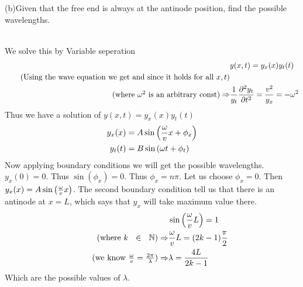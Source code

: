 \documentclass[addpoints]{exam}
\begin{document}
\begin{questions}
(b)Given that the free end is always at the antinode position, find the possible wavelengths.
\begin{solution}\\
    We solve this by Variable seperation 
    \begin{align*}
        &y(x,t) = y_x(x)y_t(t) \\ 
        \tag{Using the wave equation we get and since it holds for all $x,t$}\\ 
        \tag{where $\omega^2$ is an arbitrary const}
    \Rightarrow& \frac{1}{y_t}\pdv[2]{y_t}{t} = \frac{v^2}{y_x} = -\omega^2
    \end{align*}
    Thus we have a solution of $y(x,t)=y_x(x)y_t(t)$
    \begin{align*}
        y_x(x) &= A\sin\qty(\frac{\omega}{v}x+\phi_x)\\ 
        y_t(t) &=B \sin\qty(\omega t+\phi_t)
    \end{align*}
    Now applying boundary conditions we will get the possible wavelengths. $y_x(0)=0$. Thus 
    $\sin(\phi_x) = 0 $. Thus $\phi_x = n\pi$. Let us choose $\phi_x = 0$. Then 
    $y_x(x) = A\sin\qty(\frac{\omega}{v}x)$. The second boundary condition tell us that there is 
    an antinode at $x=L$, which says that $y_x$ will take maximum value there.
    \begin{align*}
        &\sin\qty(\frac{\omega}{v}L) = 1 \\ 
        \tag{where $k~~ \in ~~\mathbb{N} $}
        \Rightarrow& \frac{\omega}{v}L = (2k-1)\frac{\pi}{2} \\ 
        \tag{we know $\frac{\omega}{v} = \frac{2\pi}{\lambda}$}
        \Rightarrow& \lambda = \frac{4L}{2k-1}
    \end{align*}
    Which are the possible values of $\lambda$.
 
\end{solution}

\end{questions}
\end{document}
